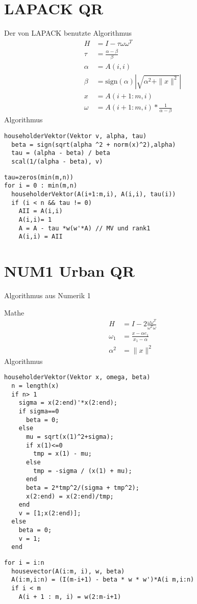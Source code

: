 \section{LAPACK QR}
Der von LAPACK benutzte Algorithmus \cite{DGEQR2}
\begin{align}
	H &= I - \tau \omega \omega^T \\
	\tau &= \frac{\alpha - \beta}{\beta} \\
	\alpha &= A(i,i)\\
	\beta &= \text{sign}(\alpha) \left|\sqrt{\alpha^2 + \|x\|^2}\right|\\
	x &= A(i+1:m,i)\\
	\omega &= A(i+1:m,i) * \frac{1}{\alpha - \beta}
\end{align}
Algorithmus
\begin{lstlisting}
householderVektor(Vektor v, alpha, tau)
  beta = sign(sqrt(alpha ^2 + norm(x)^2),alpha)
  tau = (alpha - beta) / beta	
  scal(1/(alpha - beta), v)
\end{lstlisting}
\begin{lstlisting}
tau=zeros(min(m,n))
for i = 0 : min(m,n)
  householderVektor(A(i+1:m,i), A(i,i), tau(i)) 
  if (i < n && tau != 0)
    AII = A(i,i)
    A(i,i)= 1
    A = A - tau *w(w'*A) // MV und rank1
    A(i,i) = AII
\end{lstlisting}

\section{NUM1 Urban QR}
Algorithmus aus Numerik 1

Mathe
\begin{align}
	H &= I - 2 \frac{\omega \omega^T}{\omega^T \omega}\\
	\omega_1 &= \frac{x - \alpha e_1}{x_1 - \alpha}\\
	\alpha ^2 &= \|x\|^2 
\end{align}
Algorithmus
\begin{lstlisting}
householderVektor(Vektor x, omega, beta)
  n = length(x)
  if n> 1
    sigma = x(2:end)'*x(2:end);
    if sigma==0
      beta = 0;
    else
      mu = sqrt(x(1)^2+sigma);
      if x(1)<=0
        tmp = x(1) - mu;
      else
        tmp = -sigma / (x(1) + mu);
      end
      beta = 2*tmp^2/(sigma + tmp^2);
      x(2:end) = x(2:end)/tmp;
    end
    v = [1;x(2:end)];
  else
    beta = 0;
    v = 1;
  end
\end{lstlisting}

\begin{lstlisting}
for i = i:n
  housevector(A(i:m, i), w, beta)
  A(i:m,i:n) = (I(m-i+1) - beta * w * w')*A(i m,i:n)
  if i < m
    A(i + 1 : m, i) = w(2:m-i+1)
\end{lstlisting}

